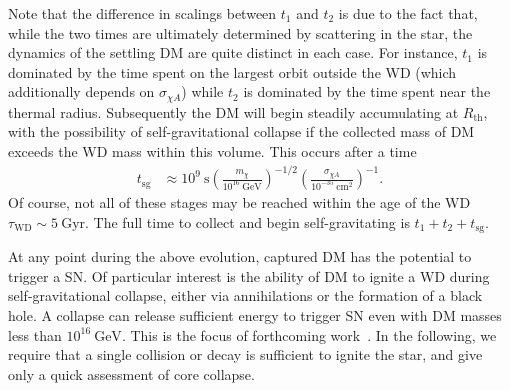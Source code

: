\documentclass[preprintnumbers,amsmath,amssymb,prd,superscriptaddress]{revtex4}
\newcommand{\GeV}{\text{GeV}}
\newcommand{\cm}{\text{cm}}
\newcommand{\x}[1]{\ensuremath{\text{#1}}} %
\def\r{\right)}
\def\l{\left(}
\begin{document}
Note that the difference in scalings between $t_1$ and $t_2$ is due to the fact that, while the two times are ultimately determined by scattering in the star, the dynamics of the settling DM are quite distinct in each case.
For instance, $t_1$ is dominated by the time spent on the largest orbit outside the WD (which additionally depends on $\sigma_{\chi A}$) while $t_2$ is dominated by the time spent near the thermal radius.
Subsequently the DM will begin steadily accumulating at $R_\text{th}$, with the possibility of self-gravitational collapse if the collected mass of DM exceeds the WD mass within this volume.
This occurs after a time
\begin{align}
\label{eq:tsg}
t_\text{sg} &\approx
  10^{9} ~\text{s} \l \frac{m_\chi}{10^{16} ~\GeV} \r^{-1/2}
  \l \frac{\sigma_{\chi A}}{10^{-35} ~\cm^2} \r^{-1}.
\end{align}
Of course, not all of these stages may be reached within the age of the WD $\tau_\text{WD} \sim 5 ~\text{Gyr}$.
The full time to collect and begin self-gravitating is $t_1 + t_2 + t_\x{sg}$.

At any point during the above evolution, captured DM has the potential to trigger a SN. 
Of particular interest is the ability of DM to ignite a WD during self-gravitational collapse, either via annihilations or the formation of a black hole.
A collapse can release sufficient energy to trigger SN even with DM masses less than $10^{16} ~\GeV$.
This is the focus of forthcoming work~\cite{us}.
In the following, we require that a single collision or decay is sufficient to ignite the star, and give only a quick assessment of core collapse.
\end{document}
